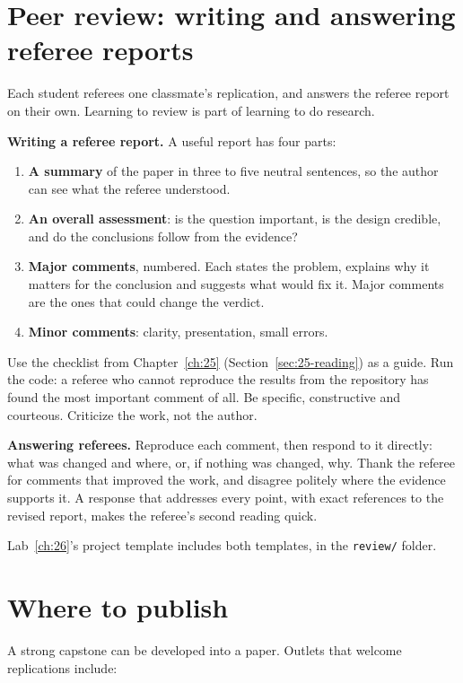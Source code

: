 \section{Peer review: writing and answering referee reports}
\label{sec:26-review}

Each student referees one classmate's replication, and answers the referee report on their own. Learning to review is part of learning to do research.

\textbf{Writing a referee report.} A useful report has four parts:

\begin{enumerate}
  \item \textbf{A summary} of the paper in three to five neutral sentences, so the author can see what the referee understood.
  \item \textbf{An overall assessment}: is the question important, is the design credible, and do the conclusions follow from the evidence?
  \item \textbf{Major comments}, numbered. Each states the problem, explains why it matters for the conclusion and suggests what would fix it. Major comments are the ones that could change the verdict.
  \item \textbf{Minor comments}: clarity, presentation, small errors.
\end{enumerate}

Use the checklist from Chapter~\ref{ch:25} (Section~\ref{sec:25-reading}) as a guide. Run the code: a referee who cannot reproduce the results from the repository has found the most important comment of all. Be specific, constructive and courteous. Criticize the work, not the author.

\textbf{Answering referees.} Reproduce each comment, then respond to it directly: what was changed and where, or, if nothing was changed, why. Thank the referee for comments that improved the work, and disagree politely where the evidence supports it. A response that addresses every point, with exact references to the revised report, makes the referee's second reading quick.

Lab~\ref{ch:26}'s project template includes both templates, in the \texttt{review/} folder.

\section{Where to publish}
\label{sec:26-publish}

A strong capstone can be developed into a paper. Outlets that welcome replications include:

